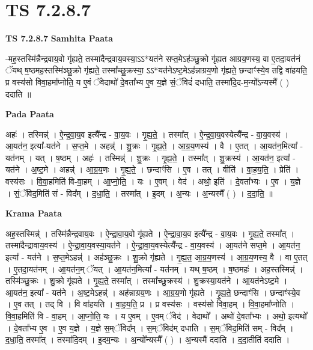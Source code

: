 \documentclass[17pt]{extarticle}
\begin{document}
\section{ TS 7.2.8.7 }

\textbf{TS 7.2.8.7 } \newline
\textbf{Samhita Paata} \newline

-मह॒स्तस्मि॑न्नैन्द्रवाय॒वो गृ॑ह्यते॒ तस्मा॑दैन्द्रवाय॒वस्या॒ऽऽ*यत॑ने सप्त॒मेऽह॑ञ्छु॒क्रो गृ॑ह्यत आग्रय॒णस्य॒ वा ए॒तदा॒यत॑नं ॅयथ् ष॒ष्ठमह॒स्तस्मि॑ञ्छु॒क्रो गृ॑ह्यते॒ तस्मा᳚च्छु॒क्रस्या॒ ऽऽ*यत॑नेऽष्ट॒मेऽह॑न्नाग्रय॒णो गृ॑ह्यते॒ छन्दाꣳ॑स्ये॒व तद्वि वा॑हयति॒ प्र वस्य॑सो विवा॒हमा᳚प्नोति॒ य ए॒वं ॅवेदाथो॑ दे॒वता᳚भ्य ए॒व य॒ज्ञे सं॒ॅविदं॑ दधाति॒ तस्मा॑दि॒द-म॒न्यो᳚ऽन्यस्मै॑ ( ) ददाति ॥ \newline

\textbf{Pada Paata} \newline

अहः॑ । तस्मिन्न्॑ । ऐ॒न्द्र॒वा॒य॒व इत्यै᳚न्द्र - वा॒य॒वः । गृ॒ह्य॒ते॒ । तस्मा᳚त् । ऐ॒न्द्र॒वा॒य॒वस्येत्यै᳚न्द्र - वा॒य॒वस्य॑ । आ॒यत॑न॒ इत्या᳚-यत॑ने । स॒प्त॒मे । अहन्न्॑ । शु॒क्रः । गृ॒ह्य॒ते॒ । आ॒ग्र॒य॒णस्य॑ । वै । ए॒तत् । आ॒यत॑न॒मित्या᳚ - यत॑नम् । यत् । ष॒ष्ठम् । अहः॑ । तस्मिन्न्॑ । शु॒क्रः । गृ॒ह्य॒ते॒ । तस्मा᳚त् । शु॒क्रस्य॑ । आ॒यत॑न॒ इत्या᳚ - यत॑ने । अ॒ष्ट॒मे । अहन्न्॑ । आ॒ग्र॒य॒णः । गृ॒ह्य॒ते॒ । छन्दाꣳ॑सि । ए॒व । तत् । वीति॑ । वा॒ह॒य॒ति॒ । प्रेति॑ । वस्य॑सः । वि॒वा॒हमिति॑ वि-वा॒हम् । आ॒प्नो॒ति॒ । यः । ए॒वम् । वेद॑ । अथो॒ इति॑ । दे॒वता᳚भ्यः । ए॒व । य॒ज्ञे । सं॒ॅविद॒मिति॑ सं - विद᳚म् । द॒धा॒ति॒ । तस्मा᳚त् । इ॒दम् । अ॒न्यः । अ॒न्यस्मै᳚ ( ) । द॒दा॒ति॒ ॥  \newline


\textbf{Krama Paata} \newline

अह॒स्तस्मिन्न्॑ । तस्मि॑न्नैन्द्रवाय॒वः । ऐ॒न्द्रा॒वा॒य॒वो गृ॑ह्यते । ऐ॒न्द्रा॒वा॒य॒व इत्यै᳚न्द्र - वा॒य॒वः । गृ॒ह्य॒ते॒ तस्मा᳚त् । तस्मा॑दैन्द्रावाय॒वस्य॑ । ऐ॒न्द्रा॒वा॒य॒वस्या॒यत॑ने । ऐ॒न्द्रा॒वा॒य॒वस्येत्यै᳚न्द्र - वा॒य॒वस्य॑ । आ॒यत॑ने सप्त॒मे । आ॒यत॑न॒ इत्या᳚ - यत॑ने । स॒प्त॒मेऽहन्न्॑ । अह॑ञ्छु॒क्रः । शु॒क्रो गृ॑ह्यते । गृ॒ह्य॒त॒ आ॒ग्र॒य॒णस्य॑ । आ॒ग्र॒य॒णस्य॒ वै । वा ए॒तत् । ए॒तदा॒यत॑नम् । आ॒यत॑न॒म् ॅयत् । आ॒यत॑न॒मित्या᳚ - यत॑नम् । यथ् ष॒ष्ठम् । ष॒ष्ठमहः॑ । अह॒स्तस्मिन्न्॑ । तस्मि॑ञ्छु॒क्रः । शु॒क्रो गृ॑ह्यते । गृ॒ह्य॒ते॒ तस्मा᳚त् । तस्मा᳚च्छु॒क्रस्य॑ । शु॒क्रस्या॒यत॑ने । आ॒यत॑नेऽष्ट॒मे । आ॒यत॑न॒ इत्या᳚ - यत॑ने । अ॒ष्ट॒मेऽहन्न्॑ । अह॑न्नाग्रय॒णः । आ॒ग्र॒य॒णो गृ॑ह्यते । गृ॒ह्य॒ते॒ छन्दाꣳ॑सि । छन्दाꣳ॑स्ये॒व । ए॒व तत् । तद् वि । वि वा॑हयति । वा॒ह॒य॒ति॒ प्र । प्र वस्य॑सः । वस्य॑सो विवा॒हम् । वि॒वा॒हमा᳚प्नोति । वि॒वा॒हमिति॑ वि - वा॒हम् । आ॒प्नो॒ति॒ यः । य ए॒वम् । ए॒वम् ॅवेद॑ । वेदाथो᳚ । अथो॑ दे॒वता᳚भ्यः । अथो॒ इत्यथो᳚ । दे॒वता᳚भ्य ए॒व । ए॒व य॒ज्ञे । य॒ज्ञे स॒म्ॅविद᳚म् । स॒म्ॅविद॑म् दधाति । स॒म्ॅविद॒मिति॑ सम् - विद᳚म् । द॒धा॒ति॒ तस्मा᳚त् । तस्मा॑दि॒दम् । इ॒दम॒न्यः । अ॒न्यो᳚न्यस्मै᳚ ( ) । अ॒न्यस्मै॑ ददाति । द॒दा॒तीति॑ ददाति । \newline
\end{document}
